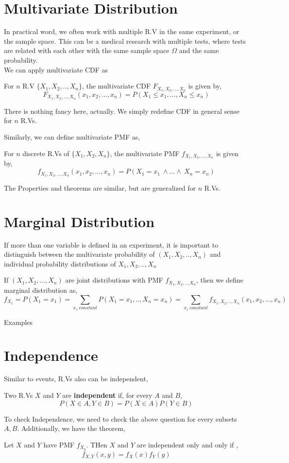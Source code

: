 \section{Multivariate Distribution}
In practical word, we often work with multiple R.V in the same experiment, or the sample space. This can be a medical research with multiple tests, where tests are related with each other with the same sample space $\Omega$ and the same probability.\\
We can apply multivariate CDF as
\begin{definition}
    For $n$  R.V $\{ X_1,X_2,..,X_n \}$, the multivariate CDF $F_{X_1,X_2,...,X_n}$ is given by,
    \[F_{X_1,X_2,...,X_n}(x_1,x_2,...,x_n) = P(X_1 \le x_1,...,X_n \le x_n) \]
\end{definition}
There is nothing fancy here, actually. We simply redefine CDF in general sense for $n$ R.Vs.
\par
Similarly, we can define multivariate PMF as,
\begin{definition} For $n$ discrete R.Vs of  $\{X_1,X_2,X_n\}$, the multivariate PMF  $f_{X_1,X_2,...,X_n}$ is given by,
    \[ f_{X_1,X_2,...,X_n}(x_1,x_2,...,x_n) = P(X_1=x_1 \ \land ... \land \ X_n = x_n) \]
\end{definition}

The Properties and theorems are similar, but are generalized for $n$ R.Vs.

\section{Marginal Distribution}
If more than one variable is defined in an experiment, it is important to distinguish between the multivariate probability of $(X_1,X_2,..,X_n)$ and individual probability distributions of $X_1,X_2,..,X_n$\\

\begin{definition}
    If $(X_1,X_2,...,X_n)$ are joint distributions with PMF $f_{X_1,X_2,..,X_n}$, then we define marginal distribution as,
    \[f_{X_1}= P(X_1 = x_1)= \sum_{x_1 \ constant} P(X_1=x_1,..,X_n=x_n)= \sum_{x_1\ constant} f_{X_1,X_2,..,X_n}(x_1,x_2,...,x_n)\]
\end{definition}
Examples 
\par
\section{Independence}
Similar to events, R.Vs also can be independent,
\begin{definition}
    Two R.Vs $X$ and $Y$ are \textbf{independent} if, for every $A$ and $B$,
    \[P(X \in A, Y \in B)= P(X \in A)P(Y \in B)\]
\end{definition}
To check Independence, we need to check the above question for every subsets $A,B$. Additionally, we have the theorem,
\begin{theorem}
    Let $X$ and $Y$ have PMF $f_{X_y}$. THen $X$ and $Y$ are independent only and only if ,
    \[f_{X,Y}(x,y)=f_X(x)f_Y(y) \]
\end{theorem}


